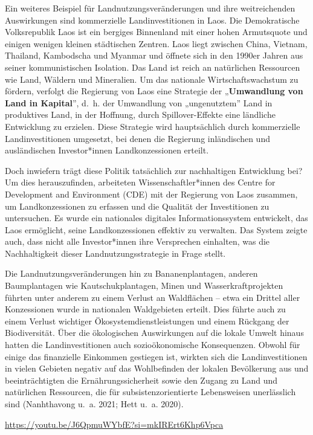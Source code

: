 \documentclass[
  nswissgerman,
  a4paper,
  openany]{book}
\begin{document}
\begin{tcolorbox}[enhanced jigsaw, arc=.35mm, bottomrule=.15mm, bottomtitle=1mm, breakable, colback=white, colbacktitle=quarto-callout-tip-color!10!white, colframe=quarto-callout-tip-color-frame, coltitle=black, left=2mm, leftrule=.75mm, opacityback=0, opacitybacktitle=0.6, rightrule=.15mm, title={Beispiel: Landinvestitionen in Laos}, titlerule=0mm, toprule=.15mm, toptitle=1mm]

Ein weiteres Beispiel für Landnutzungsveränderungen und ihre
weitreichenden Auswirkungen sind kommerzielle Landinvestitionen in Laos.
Die Demokratische Volksrepublik Laos ist ein bergiges Binnenland mit
einer hohen Armutsquote und einigen wenigen kleinen städtischen Zentren.
Laos liegt zwischen China, Vietnam, Thailand, Kambodscha und Myanmar und
öffnete sich in den 1990er Jahren aus seiner kommunistischen Isolation.
Das Land ist reich an natürlichen Ressourcen wie Land, Wäldern und
Mineralien. Um das nationale Wirtschaftswachstum zu fördern, verfolgt
die Regierung von Laos eine Strategie der „\textbf{Umwandlung von Land
in Kapital}'', d.~h. der Umwandlung von „ungenutztem'' Land in
produktives Land, in der Hoffnung, durch Spillover-Effekte eine
ländliche Entwicklung zu erzielen. Diese Strategie wird hauptsächlich
durch kommerzielle Landinvestitionen umgesetzt, bei denen die Regierung
inländischen und ausländischen Investor*innen Landkonzessionen erteilt.

Doch inwiefern trägt diese Politik tatsächlich zur nachhaltigen
Entwicklung bei? Um dies herauszufinden, arbeiteten
Wissenschaftler*innen des Centre for Development and Environment (CDE)
mit der Regierung von Laos zusammen, um Landkonzessionen zu erfassen und
die Qualität der Investitionen zu untersuchen. Es wurde ein nationales
digitales Informationssystem entwickelt, das Laos ermöglicht, seine
Landkonzessionen effektiv zu verwalten. Das System zeigte auch, dass
nicht alle Investor*innen ihre Versprechen einhalten, was die
Nachhaltigkeit dieser Landnutzungsstrategie in Frage stellt.

Die Landnutzungsveränderungen hin zu Bananenplantagen, anderen
Baumplantagen wie Kautschukplantagen, Minen und Wasserkraftprojekten
führten unter anderem zu einem Verlust an Waldflächen -- etwa ein
Drittel aller Konzessionen wurde in nationalen Waldgebieten erteilt.
Dies führte auch zu einem Verlust wichtiger Ökosystemdienstleistungen
und einem Rückgang der Biodiversität. Über die ökologischen Auswirkungen
auf die lokale Umwelt hinaus hatten die Landinvestitionen auch
sozioökonomische Konsequenzen. Obwohl für einige das finanzielle
Einkommen gestiegen ist, wirkten sich die Landinvestitionen in vielen
Gebieten negativ auf das Wohlbefinden der lokalen Bevölkerung aus und
beeinträchtigten die Ernährungssicherheit sowie den Zugang zu Land und
natürlichen Ressourcen, die für subsistenzorientierte Lebensweisen
unerlässlich sind (Nanhthavong u.~a. 2021; Hett u.~a. 2020).

\url{https://youtu.be/J6QpmuWYbfE?si=mkIRErt6Khp6Vpca}

\end{tcolorbox}
\end{document}
